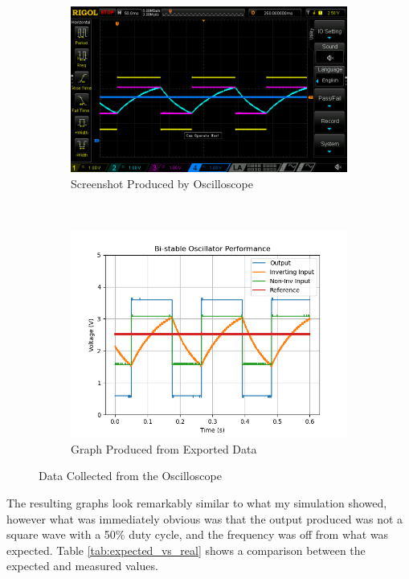 \documentclass[12pt]{article}
\begin{document}
\clearpage
\begin{figure}[h!]
\centering
\begin{subfigure}{\textwidth}
  \centering
  \includegraphics[width=0.8\linewidth]{ethan_screen_capture.png}
  \caption{Screenshot Produced by Oscilloscope}
  \label{fig:oscope_screenshot}
\end{subfigure}\\
\begin{subfigure}{\textwidth}
  \centering
  \includegraphics[width=1.0\linewidth]{ethan_plot.png}
  \caption{Graph Produced from Exported Data}
  \label{fig:oscope_graph}
\end{subfigure}
\caption{Data Collected from the Oscilloscope}
\label{fig:oscope_data}
\end{figure}
\clearpage

The resulting graphs look remarkably similar to what my simulation showed, however what was immediately obvious was that the output produced was not a square wave with a 50\% duty cycle, and the frequency was off from what was expected. Table \ref{tab:expected_vs_real} shows a comparison between the expected and measured values.
\end{document}
